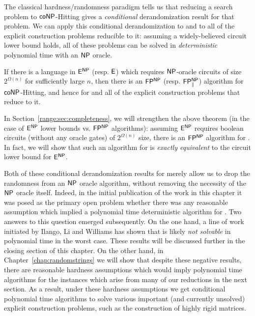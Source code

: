 The classical hardness/randomness paradigm tells us that reducing a search problem to {\sc $\cl{coNP}$-Hitting} gives a \emph{conditional} derandomization result for that problem. We can apply this conditional derandomization to \avoid and to all of the explicit construction problems reducible to it: assuming a widely-believed circuit lower bound holds, all of these problems can be solved in \emph{deterministic} polynomial time with an $\cl{NP}$ oracle.
\begin{theorem}
If there is a language in $\cl{E^{NP}}$ (resp. $\cl{E}$) which requires $\cl{NP}$-oracle circuits of size $2^{\Omega(n)}$ for sufficiently large $n$, then there is an $\cl{FP^{NP}}$ (resp. $\cl{FP_\Vert^{NP}}$) algorithm for {\sc $\cl{coNP}$-Hitting}, and hence for \avoid and all of the explicit construction problems that reduce to it.
\end{theorem}

In Section~\ref{range:sec:completeness}, we will strengthen the above theorem (in the case of $\cl{E^{NP}}$ lower bounds vs. $\cl{FP^{NP}}$ algorithms): assuming $\cl{E^{NP}}$ requires boolean circuits (without any oracle gates) of $2^{\Omega(n)}$ size, there is an $\cl{FP^{NP}}$ algorithm for \avoid. In fact, we will show that such an algorithm for \avoid is \emph{exactly equivalent} to the circuit lower bound for $\cl{E^{NP}}$. 

Both of these conditional derandomization results for \avoid merely allow us to drop the randomness from an $\cl{NP}$ oracle algorithm, without removing the necessity of the $\cl{NP}$ oracle itself. Indeed, in the initial publication of the work in this chapter it was posed as the primary open problem whether there was any reasonable assumption which implied a polynomial time deterministic algorithm for \avoid. Two answers to this question emerged subsequently. On the one hand, a line of work initiated by Ilango, Li and Williams \cite{ILW23,CL24,RWZ26,Ilango25ODH} has shown that \avoid is likely \emph{not solvable} in polynomial time in the worst case. These results will be discussed further in the closing section of this chapter. On the other hand, in Chapter~\ref{chap:randomstrings} we will show that despite these negative results, there are reasonable hardness assumptions which would imply polynomial time algorithms for the \avoid instances which arise from many of our reductions in the next section. As a result, under these hardness assumptions we get conditional polynomial time algorithms to solve various important (and currently unsolved) explicit construction problems, such as the construction of highly rigid matrices.

